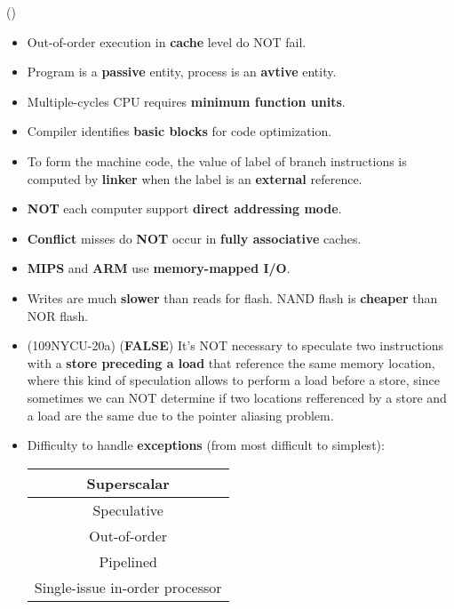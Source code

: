 \item \begin{theorem}{()} \quad\quad \begin{itemize}
        \item Out-of-order execution in \textbf{cache} level do NOT fail.
        \item Program is a \textbf{passive} entity, process is an \textbf{avtive} entity.
        \item Multiple-cycles CPU requires \textbf{minimum function units}.
        \item Compiler identifies \textbf{basic blocks} for code optimization.
        \item To form the machine code, the value of label of branch instructions is computed by \textbf{linker} when the label is an \textbf{external} reference.
        \item \textbf{NOT} each computer support \textbf{direct addressing mode}.
        \item \textbf{Conflict} misses do \textbf{NOT} occur in \textbf{fully associative} caches.
        \item \textbf{MIPS} and \textbf{ARM} use \textbf{memory-mapped I/O}.
        \item Writes are much \textbf{slower} than reads for flash. NAND flash is \textbf{cheaper} than NOR flash.
        \item (109NYCU-20a) (\textbf{FALSE}) It's NOT necessary to speculate two instructions with a \textbf{store preceding a load} that reference the same memory location, where this kind of speculation allows to perform a load before a store, since sometimes we can NOT determine if two locations refferenced by a store and a load are the same due to the pointer aliasing problem.
        \item Difficulty to handle \textbf{exceptions} (from most difficult to simplest): \begin{table}[H]
            \centering
            \begin{tabular}{|c|}
                \hline
                Superscalar \\
                \hline
                Speculative \\
                \hline
                Out-of-order \\
                \hline
                Pipelined \\
                \hline
                Single-issue in-order processor \\
                \hline

\end{tabular}
\end{table}
\end{itemize}
\end{theorem}
